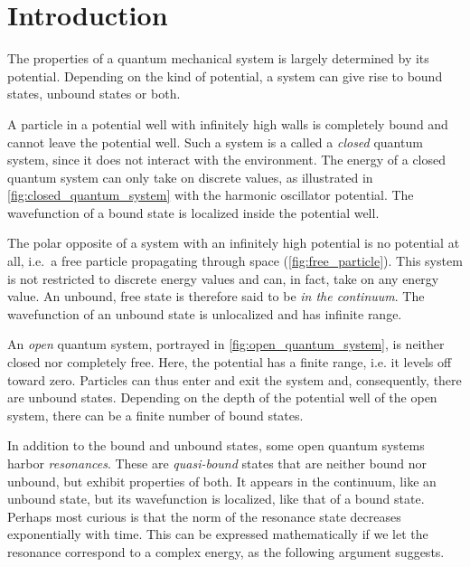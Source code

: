 \documentclass[../main/report.tex]{subfiles}
\begin{document}
\chapter{Introduction}

The properties of a quantum mechanical system is largely determined by its potential. 
Depending on the kind of potential, a system can give rise to bound states, unbound states or both.

A particle in a potential well with infinitely high walls is completely bound and cannot leave the potential well.
Such a system is a called a \emph{closed} quantum system, since it does not interact with the environment. 
The energy of a closed quantum system can only take on discrete values, as illustrated in \cref{fig:closed_quantum_system} with the harmonic oscillator potential.
The wavefunction of a bound state is localized inside the potential well.

The polar opposite of a system with an infinitely high potential is no potential at all, i.e.~a free particle propagating through space (\cref{fig:free_particle}).
This system is not restricted to discrete energy values and can, in fact, take on any energy value.
An unbound, free state is therefore said to be \emph{in the continuum}.
The wavefunction of an unbound state is unlocalized and has infinite range.

An \emph{open} quantum system, portrayed in \cref{fig:open_quantum_system}, is neither closed nor completely free.
Here, the potential has a finite range, i.e. it levels off toward zero.
Particles can thus enter and exit the system and, consequently, there are unbound states.
Depending on the depth of the potential well of the open system, there can be a finite number of bound states.

In addition to the bound and unbound states, some open quantum systems harbor \emph{resonances}. 
These are \emph{quasi-bound} states that are neither bound nor unbound, but exhibit properties of both. 
It appears in the continuum, like an unbound state, but its wavefunction is localized, like that of a bound state.
Perhaps most curious is that the norm of the resonance state decreases exponentially with time.
This can be expressed mathematically if we let the resonance correspond to a complex energy, as the following argument suggests.
\end{document}
